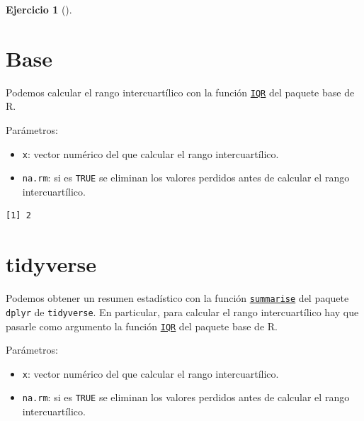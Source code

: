 \documentclass[
  spanish,
  a4paper,
]{scrreport}
\newenvironment{Shaded}{\begin{snugshade}}{\end{snugshade}}
\newcommand{\FunctionTok}[1]{\textcolor[rgb]{0.28,0.35,0.67}{#1}}
\newcommand{\NormalTok}[1]{\textcolor[rgb]{0.00,0.23,0.31}{#1}}
\newcommand{\SpecialCharTok}[1]{\textcolor[rgb]{0.37,0.37,0.37}{#1}}
\providecommand{\tightlist}{%
  \setlength{\itemsep}{0pt}\setlength{\parskip}{0pt}}
\theoremstyle{definition}
\newtheorem{exercise}{Ejercicio}[chapter]
\theoremstyle{remark}
\begin{document}
\begin{exercise}[]
\begin{enumerate}
\begin{tcolorbox}
  \section{Base}

  Podemos calcular el rango intercuartílico con la función
  \href{https://www.rdocumentation.org/packages/base/versions/3.6.2/topics/IQR}{\texttt{IQR}}
  del paquete base de R.

  Parámetros:

  \begin{itemize}
  \tightlist
  \item
    \texttt{x}: vector numérico del que calcular el rango
    intercuartílico.
  \item
    \texttt{na.rm}: si es \texttt{TRUE} se eliminan los valores perdidos
    antes de calcular el rango intercuartílico.
  \end{itemize}

\begin{Shaded}
\end{Shaded}

\begin{verbatim}
[1] 2
\end{verbatim}

  \section{tidyverse}

  Podemos obtener un resumen estadístico con la función
  \href{https://dplyr.tidyverse.org/reference/summarise.html}{\texttt{summarise}}
  del paquete \texttt{dplyr} de \texttt{tidyverse}. En particular, para
  calcular el rango intercuartílico hay que pasarle como argumento la
  función
  \href{https://www.rdocumentation.org/packages/base/versions/3.6.2/topics/IQR}{\texttt{IQR}}
  del paquete base de R.

  Parámetros:

  \begin{itemize}
  \tightlist
  \item
    \texttt{x}: vector numérico del que calcular el rango
    intercuartílico.
  \item
    \texttt{na.rm}: si es \texttt{TRUE} se eliminan los valores perdidos
    antes de calcular el rango intercuartílico.
  \end{itemize}


\end{tcolorbox}
\end{enumerate}
\end{exercise}
\end{document}
